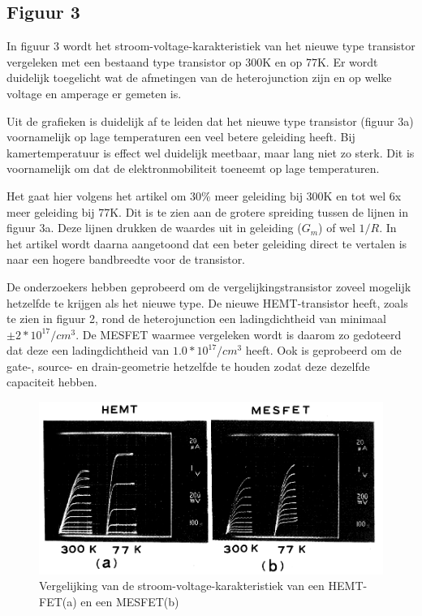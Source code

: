 \documentclass[11pt]{article}
\begin{document}
\subsection{Figuur 3}
In figuur 3 wordt het stroom-voltage-karakteristiek van het nieuwe type transistor vergeleken met een bestaand type transistor op 300K en op 77K. Er wordt duidelijk toegelicht wat de afmetingen van de heterojunction zijn en op welke voltage en amperage er gemeten is.

Uit de grafieken is duidelijk af te leiden dat het nieuwe type transistor (figuur 3a) voornamelijk op lage temperaturen een veel betere geleiding heeft. Bij kamertemperatuur is effect wel duidelijk meetbaar, maar lang niet zo sterk. Dit is voornamelijk om dat de elektronmobiliteit toeneemt op lage temperaturen. 

Het gaat hier volgens het artikel om 30\% meer geleiding bij 300K en tot wel 6x  meer geleiding bij 77K. Dit is te zien aan de grotere spreiding tussen de lijnen in figuur 3a. Deze lijnen drukken de waardes uit in geleiding ($G_m$) of wel  $1/R$. In het artikel wordt daarna aangetoond dat een beter geleiding direct te vertalen is naar een hogere bandbreedte voor de transistor.

De onderzoekers hebben geprobeerd om de vergelijkingstransistor zoveel mogelijk hetzelfde te krijgen als het nieuwe type. De nieuwe HEMT-transistor heeft, zoals te zien in figuur 2, rond de heterojunction een ladingdichtheid van minimaal $\pm2*10^{17}/cm^3$. De MESFET waarmee vergeleken wordt is daarom zo gedoteerd dat deze een ladingdichtheid van $1.0 * 10^{17}/cm^3$ heeft. Ook is geprobeerd om de gate-, source- en drain-geometrie hetzelfde te houden zodat deze dezelfde capaciteit hebben.

\begin{figure}[h]
  \begin{center}
\includegraphics[width=\textwidth]{CV-characteristics.png}
\caption{Vergelijking van de stroom-voltage-karakteristiek van een HEMT-FET(a) en een MESFET(b)}
\label{fig:cv_karakteristieken}
  \end{center}
\end{figure}
\end{document}
